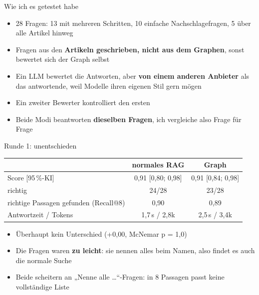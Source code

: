 \documentclass[aspectratio=169,11pt]{beamer}
\newcommand{\hl}[1]{\textcolor{midblue}{\textbf{#1}}}
\begin{document}
\begin{frame}{Wie ich es getestet habe}
  \begin{itemize}
    \item 28 Fragen: 13 mit mehreren Schritten, 10 einfache Nachschlagefragen, 5 über alle Artikel hinweg
    \item Fragen aus den \hl{Artikeln geschrieben, nicht aus dem Graphen}, sonst bewertet sich der Graph selbst
    \item Ein LLM bewertet die Antworten, aber \hl{von einem anderen Anbieter} als das antwortende,
          weil Modelle ihren eigenen Stil gern mögen
    \item Ein zweiter Bewerter kontrolliert den ersten
    \item Beide Modi beantworten \hl{dieselben Fragen}, ich vergleiche also Frage für Frage
  \end{itemize}
\end{frame}

\begin{frame}{Runde 1: unentschieden}
  \centering
  \begin{tabular}{lcc}
    \toprule
    & normales RAG & Graph \\
    \midrule
    Score [95\,\%-KI] & 0,91 [0,80; 0,98] & 0,91 [0,84; 0,98] \\
    richtig & 24/28 & 23/28 \\
    richtige Passagen gefunden (Recall@8) & 0,90 & 0,89 \\
    Antwortzeit / Tokens & 1,7\,s / 2,8k & 2,5\,s / 3,4k \\
    \bottomrule
  \end{tabular}
  \vspace{8pt}
  \begin{itemize}\small
    \item Überhaupt kein Unterschied (+0,00, McNemar p = 1,0)
    \item Die Fragen waren \hl{zu leicht}: sie nennen alles beim Namen, also findet es auch die normale Suche
    \item Beide scheitern an „Nenne alle \ldots“-Fragen: in 8 Passagen passt keine vollständige Liste
  \end{itemize}
\end{frame}
\end{document}
